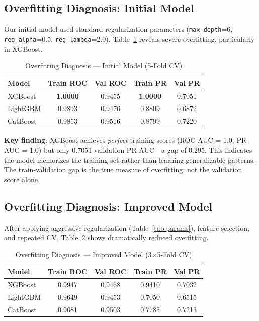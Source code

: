 \documentclass[conference]{IEEEtran}
\begin{document}
\subsection{Overfitting Diagnosis: Initial Model}

Our initial model used standard regularization parameters (\texttt{max\_depth}=6, \texttt{reg\_alpha}=0.5, \texttt{reg\_lambda}=2.0). Table~\ref{tab:overfit_initial} reveals severe overfitting, particularly in XGBoost.

\begin{table}[t]
\caption{Overfitting Diagnosis --- Initial Model (5-Fold CV)}
\label{tab:overfit_initial}
\centering
\small
\begin{tabular}{@{}lcccc@{}}
\toprule
\textbf{Model} & \textbf{Train ROC} & \textbf{Val ROC} & \textbf{Train PR} & \textbf{Val PR} \\
\midrule
XGBoost & \textbf{1.0000} & 0.9455 & \textbf{1.0000} & 0.7051 \\
LightGBM & 0.9893 & 0.9476 & 0.8809 & 0.6872 \\
CatBoost & 0.9853 & 0.9516 & 0.8799 & 0.7220 \\
\bottomrule
\end{tabular}
\vspace{-1mm}
\end{table}

\textbf{Key finding}: XGBoost achieves \textit{perfect} training scores (ROC-AUC = 1.0, PR-AUC = 1.0) but only 0.7051 validation PR-AUC---a gap of 0.295. This indicates the model memorizes the training set rather than learning generalizable patterns. The train-validation gap is the true measure of overfitting, not the validation score alone.

\subsection{Overfitting Diagnosis: Improved Model}

After applying aggressive regularization (Table~\ref{tab:params}), feature selection, and repeated CV, Table~\ref{tab:overfit_improved} shows dramatically reduced overfitting.

\begin{table}[t]
\caption{Overfitting Diagnosis --- Improved Model (3$\times$5-Fold CV)}
\label{tab:overfit_improved}
\centering
\small
\begin{tabular}{@{}lcccc@{}}
\toprule
\textbf{Model} & \textbf{Train ROC} & \textbf{Val ROC} & \textbf{Train PR} & \textbf{Val PR} \\
\midrule
XGBoost & 0.9947 & 0.9468 & 0.9410 & 0.7032 \\
LightGBM & 0.9649 & 0.9453 & 0.7050 & 0.6515 \\
CatBoost & 0.9681 & 0.9503 & 0.7785 & 0.7213 \\
\bottomrule
\end{tabular}
\vspace{-1mm}
\end{table}
\end{document}
